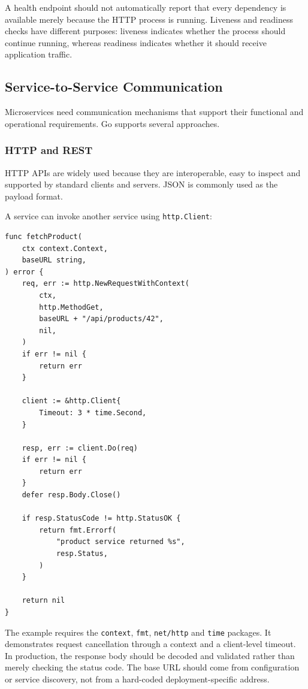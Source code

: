 A health endpoint should not automatically report that every dependency is available merely because the HTTP process is running. Liveness and readiness checks have different purposes: liveness indicates whether the process should continue running, whereas readiness indicates whether it should receive application traffic.\\

\subsection{Service-to-Service Communication}

Microservices need communication mechanisms that support their functional and operational requirements. Go supports several approaches.

\subsubsection{HTTP and REST}

HTTP APIs are widely used because they are interoperable, easy to inspect and supported by standard clients and servers. JSON is commonly used as the payload format.

A service can invoke another service using \texttt{http.Client}:

\begin{lstlisting}
func fetchProduct(
    ctx context.Context,
    baseURL string,
) error {
    req, err := http.NewRequestWithContext(
        ctx,
        http.MethodGet,
        baseURL + "/api/products/42",
        nil,
    )
    if err != nil {
        return err
    }

    client := &http.Client{
        Timeout: 3 * time.Second,
    }

    resp, err := client.Do(req)
    if err != nil {
        return err
    }
    defer resp.Body.Close()

    if resp.StatusCode != http.StatusOK {
        return fmt.Errorf(
            "product service returned %s",
            resp.Status,
        )
    }

    return nil
}
\end{lstlisting}

The example requires the \texttt{context}, \texttt{fmt}, \texttt{net/http} and \texttt{time} packages. It demonstrates request cancellation through a context and a client-level timeout.\\

In production, the response body should be decoded and validated rather than merely checking the status code. The base URL should come from configuration or service discovery, not from a hard-coded deployment-specific address.\\

